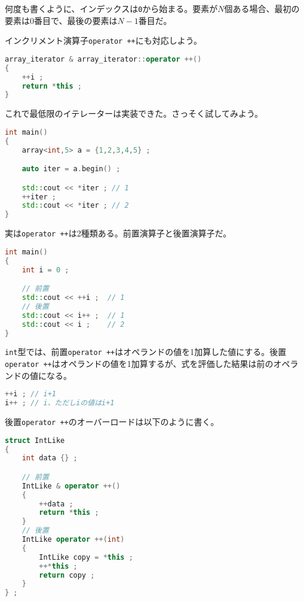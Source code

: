 何度も書くように、インデックスは\texttt{0}から始まる。要素が\(N\)個ある場合、最初の要素は0番目で、最後の要素は\(N-1\)番目だ。

インクリメント演算子\texttt{operator ++}にも対応しよう。

\begin{lstlisting}[language={C++}]
array_iterator & array_iterator::operator ++()
{
    ++i ;
    return *this ;
}
\end{lstlisting}

これで最低限のイテレーターは実装できた。さっそく試してみよう。

\begin{lstlisting}[language={C++}]
int main()
{
    array<int,5> a = {1,2,3,4,5} ;

    auto iter = a.begin() ;

    std::cout << *iter ; // 1
    ++iter ;
    std::cout << *iter ; // 2
}
\end{lstlisting}

実は\texttt{operator ++}は2種類ある。前置演算子と後置演算子だ。

\begin{lstlisting}[language={C++}]
int main()
{
    int i = 0 ;

    // 前置
    std::cout << ++i ;  // 1
    // 後置
    std::cout << i++ ;  // 1
    std::cout << i ;    // 2
}
\end{lstlisting}

\texttt{int}型では、前置\texttt{operator ++}はオペランドの値を1加算した値にする。後置\texttt{operator ++}はオペランドの値を1加算するが、式を評価した結果は前のオペランドの値になる。

\begin{lstlisting}[language={C++}]
++i ; // i+1
i++ ; // i、ただしiの値はi+1
\end{lstlisting}

後置\texttt{operator ++}のオーバーロードは以下のように書く。

\begin{lstlisting}[language={C++}]
struct IntLike
{
    int data {} ;

    // 前置
    IntLike & operator ++()
    {
        ++data ;
        return *this ;
    }
    // 後置
    IntLike operator ++(int)
    {
        IntLike copy = *this ;
        ++*this ;
        return copy ;
    }
} ;
\end{lstlisting}


